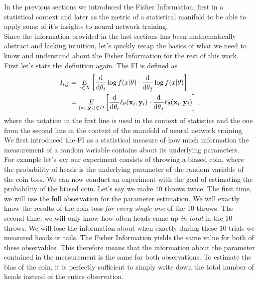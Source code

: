In the previous sections we introduced the Fisher Information, first in a statistical context and later as the metric of a statistical manifold to be able to apply some of it's insights to neural network training.\\
Since the information provided in the last sections has been mathematically abstract and lacking intuition, let's quickly recap the basics of what we need to know and understand about the Fisher Information for the rest of this work.\\
First let's state the definition again. The FI is defined as 
\begin{equation}
	\begin{split}
		I_{i,j} &= \underset{x \in X}{E} \left[\frac{\mathrm{d}}{\mathrm{d}\theta_i}\log f(x|\theta)\cdot \frac{\mathrm{d}}{\mathrm{d}\theta_j}\log f(x|\theta)\right]\\
		&= \underset{(\mathbf{x}_i,\mathbf{y}_i)\in D}{E} \left[\frac{\mathrm{d}}{\mathrm{d}\theta_i}\ell_\theta(\mathbf{x}_i,\mathbf{y}_i)\cdot \frac{\mathrm{d}}{\mathrm{d}\theta_j}\ell_\theta(\mathbf{x}_i,\mathbf{y}_i)\right],
	\end{split}
\end{equation}
where the notation in the first line is used in the context of statistics and the one from the second line in the context of the manifold of neural network training.\\
We first introduced the FI as a statistical measure of how much information the measurement of a random variable contains about its underlying parameters.\\
For example let's say our experiment consists of throwing a biased coin, where the probability of heads is the underlying parameter of the random variable of the coin toss. We can now conduct an experiment with the goal of estimating the probability of the biased coin. Let's say we make 10 throws twice. The first time, we will use the full observation for the parameter estimation. We will exactly know the results of the coin toss \emph{for every single one} of the 10 throws. The second time, we will only know how often heads came up \emph{in total} in the 10 throws. We will lose the information about when exactly during these 10 trials we measured heads or tails. The Fisher Information yields the same value for both of these observables. This therefore means that the information about the parameter contained in the measurement is the same for both observations. To estimate the bias of the coin, it is perfectly sufficient to simply write down the total number of heads instead of the entire observation.\\
